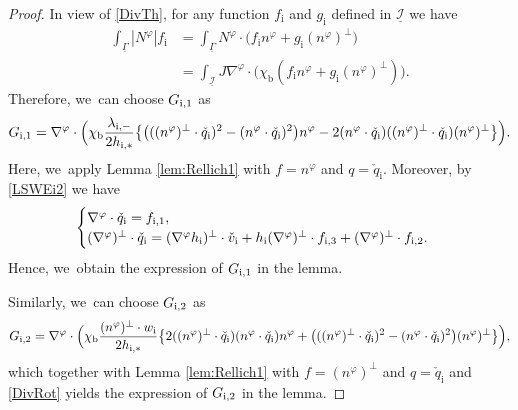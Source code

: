 \documentclass[JEP,XML,SOM,Unicode,NoFloatCountersInSection,published]{cedram}
\newcommand{\cI}{{\mathcal I}}
\newcommand{\ul}[1]{\underline{#1}}
\newcommand{\itGamma}{\mathit{\Gamma}}
\theoremstyle{definition}
\begin{document}
\begin{proof}
In view of \eqref{DivTh}, for any function $f_\mathrm{i}$ and $g_\mathrm{i}$ defined in $\ul{\cI}$ we have
\begin{align*}
\int_{\ul{\itGamma}}|N^\varphi|f_\mathrm{i}
&= \int_{\ul{\itGamma}}N^\varphi\cdot\bigl(f_\mathrm{i}n^\varphi + g_\mathrm{i}(n^\varphi)^\perp\bigr) \\
&= \int_{\ul{\cI}}J\nabla^\varphi\cdot\bigl(\chi_\mathrm{b}(f_\mathrm{i}n^\varphi + g_\mathrm{i}(n^\varphi)^\perp) \bigr).
\end{align*}
Therefore, we~can choose $G_{{\rm i},1}$ as
\[
G_{{\rm i},1} = \nabla^\varphi\cdot\Bigl(\chi_\mathrm{b}\frac{\lambda_{{\rm i},-}}{2h_{{\rm i},*}}\bigl\{
\bigl(((n^\varphi)^\perp\cdot\check{q}_\mathrm{i})^2 - (n^\varphi\cdot\check{q}_\mathrm{i})^2 \bigr)n^\varphi
- 2(n^\varphi\cdot\check{q}_\mathrm{i})((n^\varphi)^\perp\cdot\check{q}_\mathrm{i}) (n^\varphi)^\perp \bigr\} \Bigr).
\]
Here, we~apply Lemma \ref{lem:Rellich1} with $f=n^\varphi$ and $q=\check{q}_\mathrm{i}$.
Moreover, by \eqref{LSWEi2} we have
\begin{equation}\label{DivRot}
\begin{cases}
\nabla^\varphi\cdot\check{q}_\mathrm{i}=f_{{\rm i},1}, \\
(\nabla^\varphi)^\perp\cdot\check{q}_\mathrm{i}
=(\nabla^\varphi h_\mathrm{i})^\perp\cdot\check{v}_\mathrm{i} + h_\mathrm{i}(\nabla^\varphi)^\perp\cdot f_{{\rm i},3} + (\nabla^\varphi)^\perp\cdot f_{{\rm i},2}.
\end{cases}
\end{equation}
Hence, we~obtain the expression of $G_{{\rm i},1}$ in the lemma.

Similarly, we~can choose $G_{{\rm i},2}$ as
\[
G_{{\rm i},2 } = \nabla^\varphi\cdot\Bigl(\chi_\mathrm{b}\frac{(n^\varphi)^\perp\cdot w_\mathrm{i}}{2h_{{\rm i},*}}\bigl\{
2((n^\varphi)^\perp\cdot\check{q}_\mathrm{i})(n^\varphi\cdot\check{q}_\mathrm{i}) n^\varphi
+ \bigl(((n^\varphi)^\perp\cdot\check{q}_\mathrm{i})^2 - (n^\varphi\cdot\check{q}_\mathrm{i})^2 \bigr) (n^\varphi)^\perp \bigr\} \Bigr),
\]
which together with Lemma \ref{lem:Rellich1} with $f=(n^\varphi)^\perp$ and $q=\check{q}_\mathrm{i}$
and \eqref{DivRot} yields the expression of $G_{{\rm i},2}$ in the lemma.


\end{proof}
\end{document}
